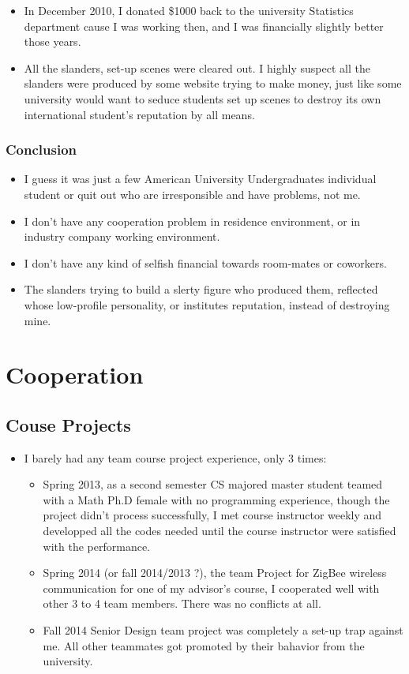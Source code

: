 \documentclass[9pt,b5paper]{article}
\begin{document}
\begin{enumerate}
\begin{itemize}
\begin{itemize}
\item In December 2010, I donated \$1000 back to the university Statistics department cause I was working then, and I was financially slightly better those years.
\item All the slanders, set-up scenes were cleared out. I highly suspect all the slanders were produced by some website trying to make money, just like some university would want to seduce students set up scenes to destroy its own international student's reputation by all means.
\end{itemize}
\end{itemize}
\end{enumerate}

\subsubsection{Conclusion}
\label{sec-2-4-3}
\begin{itemize}
\item I guess it was just a few American University Undergraduates individual student or quit out who are irresponsible and have problems, not me.
\item I don't have any cooperation problem in residence environment, or in industry company working environment.
\item I don't have any kind of selfish financial towards room-mates or coworkers.
\item The slanders trying to build a slerty figure who produced them, reflected whose low-profile personality, or institutes reputation, instead of destroying mine.
\end{itemize}

\section{Cooperation}
\label{sec-3}
\subsection{Couse Projects}
\label{sec-3-1}
\begin{itemize}
\item I barely had any team course project experience, only 3 times:
\begin{itemize}
\item Spring 2013, as a second semester CS majored master student teamed with a Math Ph.D female with no programming experience, though the project didn't process successfully, I met course instructor weekly and developped all the codes needed until the course instructor were satisfied with the performance.
\item Spring 2014 (or fall 2014/2013 ?), the team Project for ZigBee wireless communication for one of my advisor's course, I cooperated well with other 3 to 4 team members. There was no conflicts at all.
\item Fall 2014 Senior Design team project was completely a set-up trap against me. All other teammates got promoted by their bahavior from the university.
\end{itemize}
\end{itemize}
\end{document}
